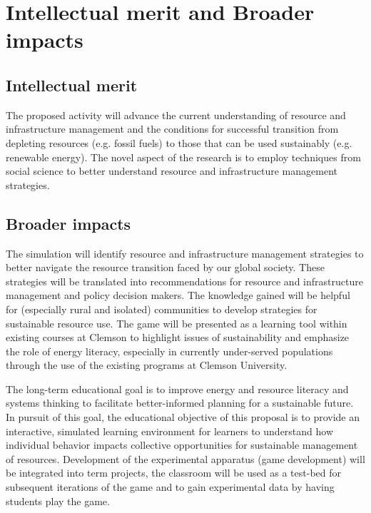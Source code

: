 \documentclass[11pt,a4paper]{article}
\begin{document}
\section{Intellectual merit and Broader impacts}


\subsection{Intellectual merit}


The proposed activity will advance the current understanding of 
resource and infrastructure management and 
the conditions for successful transition from depleting resources (e.g. fossil fuels) 
to those that can be used sustainably (e.g. renewable energy). 
The novel aspect of the research is to employ techniques from social science 
to better understand resource and infrastructure management strategies.

\subsection{Broader impacts}


The simulation will identify resource and infrastructure management strategies 
to better navigate the resource transition faced by our global society. 
These strategies will be translated into recommendations for 
resource and infrastructure management and policy decision makers. 
The knowledge gained will be helpful for (especially rural and isolated) communities 
to develop strategies for sustainable resource use. 
The game will be presented as a learning tool within existing courses at Clemson 
to highlight issues of sustainability and emphasize the role of energy literacy, 
especially in currently under-served populations 
through the use of the existing programs at Clemson University.  

The long-term educational goal is to 
improve energy and resource literacy and systems thinking 
to facilitate better-informed planning for a sustainable future. 
In pursuit of this goal, the educational objective of this proposal 
is to provide an interactive, simulated learning environment for learners 
to understand how individual behavior impacts collective opportunities 
for sustainable management of resources. 
Development of the experimental apparatus (game development) will be integrated into term projects, 
the classroom will be used as a test-bed for subsequent iterations of the game 
and to gain experimental data by having students play the game. 
\end{document}
